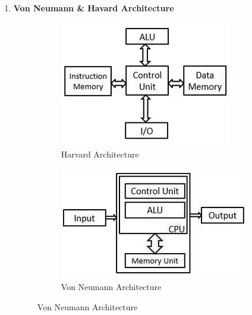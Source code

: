 \documentclass[a4paper]{article}
\begin{document}
\begin{enumerate}[label = \arabic*.]
    \item \textbf{Von Neumann \& Havard Architecture}
      \begin{figure}[H]
        \centering
        \begin{subfigure}[b]{0.45\linewidth}
          \centering
          \includegraphics[width=0.9\linewidth]{Harvard_architecture.jpeg}
          \caption{Harvard Architecture}
          \label{subfig:Harvard_architecture.jpeg}
        \end{subfigure}
        \begin{subfigure}[b]{0.45\linewidth}
          \centering
          \includegraphics[width=0.9\linewidth]{Von_neumann_architecture.jpeg}
          \caption{Von Neumann Architecture}
          \label{subfig:Von_neumann_architecture.jpeg}
        \end{subfigure}
      \end{figure}


\end{enumerate}
\end{document}
